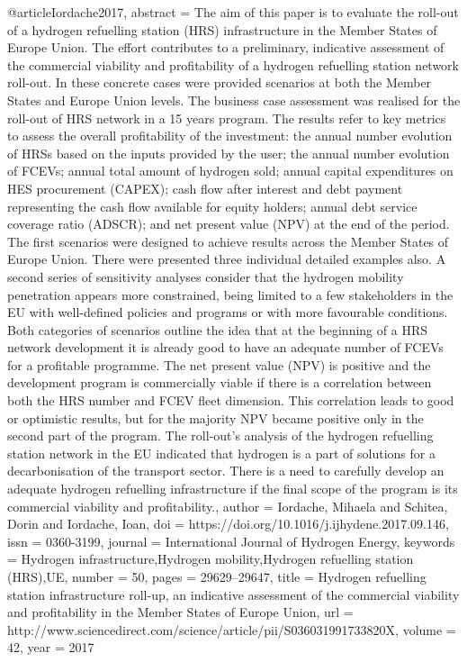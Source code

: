 @article{Iordache2017,
abstract = {The aim of this paper is to evaluate the roll-out of a hydrogen refuelling station (HRS) infrastructure in the Member States of Europe Union. The effort contributes to a preliminary, indicative assessment of the commercial viability and profitability of a hydrogen refuelling station network roll-out. In these concrete cases were provided scenarios at both the Member States and Europe Union levels. The business case assessment was realised for the roll-out of HRS network in a 15 years program. The results refer to key metrics to assess the overall profitability of the investment: the annual number evolution of HRSs based on the inputs provided by the user; the annual number evolution of FCEVs; annual total amount of hydrogen sold; annual capital expenditures on HES procurement (CAPEX); cash flow after interest and debt payment representing the cash flow available for equity holders; annual debt service coverage ratio (ADSCR); and net present value (NPV) at the end of the period. The first scenarios were designed to achieve results across the Member States of Europe Union. There were presented three individual detailed examples also. A second series of sensitivity analyses consider that the hydrogen mobility penetration appears more constrained, being limited to a few stakeholders in the EU with well-defined policies and programs or with more favourable conditions. Both categories of scenarios outline the idea that at the beginning of a HRS network development it is already good to have an adequate number of FCEVs for a profitable programme. The net present value (NPV) is positive and the development program is commercially viable if there is a correlation between both the HRS number and FCEV fleet dimension. This correlation leads to good or optimistic results, but for the majority NPV became positive only in the second part of the program. The roll-out's analysis of the hydrogen refuelling station network in the EU indicated that hydrogen is a part of solutions for a decarbonisation of the transport sector. There is a need to carefully develop an adequate hydrogen refuelling infrastructure if the final scope of the program is its commercial viability and profitability.},
author = {Iordache, Mihaela and Schitea, Dorin and Iordache, Ioan},
doi = {https://doi.org/10.1016/j.ijhydene.2017.09.146},
issn = {0360-3199},
journal = {International Journal of Hydrogen Energy},
keywords = {Hydrogen infrastructure,Hydrogen mobility,Hydrogen refuelling station (HRS),UE},
number = {50},
pages = {29629--29647},
title = {{Hydrogen refuelling station infrastructure roll-up, an indicative assessment of the commercial viability and profitability in the Member States of Europe Union}},
url = {http://www.sciencedirect.com/science/article/pii/S036031991733820X},
volume = {42},
year = {2017}
}
